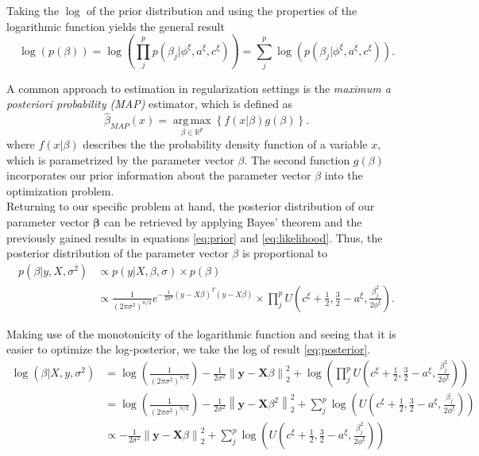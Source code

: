 \documentclass[12pt,a4paper]{article}
\newcommand{\norm}[1]{\left\lVert#1\right\rVert}
\DeclareMathOperator*{\argmax}{arg\,max}
\begin{document}
Taking the $\log$ of the prior distribution and using the properties of the logarithmic function yields the general result
\[
\log(p(\beta))=\log(\prod_j^p p(\beta_j|\phi^\xi, a^\xi, c^\xi))=\sum_j^p \log(p(\beta_j|\phi^\xi, a^\xi, c^\xi)).
\]

A common approach to estimation in regularization settings is the \textit{maximum a posteriori probability (MAP)} estimator, which is defined as
\[
\hat{\beta}_{MAP}(x) = \underset{\beta \in \mathbb{R}^p}{\argmax}\left\{f(x|\beta)g(\beta)\right\}.
\]
where $f(x|\beta)$ describes the the probability density function of a variable $x$, which is parametrized by the parameter vector $\beta$. The second function $g(\beta)$ incorporates our prior information about the parameter vector $\beta$ into the optimization problem.\\  

Returning to our specific problem at hand, the posterior distribution of our parameter vector $\mathbf{\beta}$ can be retrieved by applying Bayes' theorem and the previously gained results in equations \ref{eq:prior} and \ref{eq:likelihood}. Thus, the posterior distribution of the parameter vector $\beta$ is proportional to
\begin{align}
p(\beta|y, X, \sigma^2) 	&\propto p(y|X,\beta,\sigma)\times p(\beta) \nonumber\\
						&\propto \frac{1}{(2\pi\sigma^2)^{n/2}}e^{-\frac{1}{2\sigma^2}(y-X\beta)^T(y-X\beta)} \times \prod_j^p U\left(c^\xi + \frac{1}{2}, \frac{3}{2}-a^\xi, \frac{\beta_j^2}{2\phi^\xi}\right).\label{eq:posterior}
\end{align} 

Making use of the monotonicity of the logarithmic function and seeing that it is easier to optimize the log-posterior, we take the log of result \ref{eq:posterior}. 
\begin{align}
\log(\beta| X, y, \sigma^2) 	&= \log\left(\frac{1}{(2\pi\sigma^2)^{n/2}}\right) - \frac{1}{2\sigma^2}\norm{\mathbf{y} - \mathbf{X}\beta}_2^2 + \log\left(\prod_j^p U\left(c^\xi + \frac{1}{2}, \frac{3}{2}-a^\xi, \frac{\beta_j^2}{2\phi^\xi}\right)\right)\nonumber\\
							&= \log\left(\frac{1}{(2\pi\sigma^2)^{n/2}}\right) - \frac{1}{2\sigma^2}\norm{\mathbf{y} - \mathbf{X}\beta^2}_2^2 + \sum_j^p \log\left(U\left(c^\xi + \frac{1}{2}, \frac{3}{2}-a^\xi, \frac{\beta_j}{2\phi^\xi}\right)\right)\nonumber\\
							&\propto -\frac{1}{2\sigma^2}\norm{\mathbf{y} - \mathbf{X}\beta}_2^2 + \sum_j^p \log\left(U\left(c^\xi + \frac{1}{2}, \frac{3}{2}-a^\xi, \frac{\beta_j^2}{2\phi^\xi}\right)\right)\nonumber
\end{align}
\end{document}
